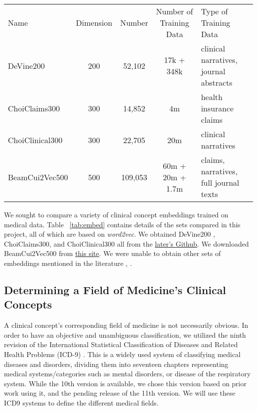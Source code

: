 \documentclass[11pt,a4paper]{article}
\begin{document}
\begin{table*}[h!]
	
	\begin{center}
		\begin{tabular}{lcccl} %
			Name & Dimension & Number & Number of Training Data& Type of Training Data \\
			\hlineB{4}
			DeVine200 & 200 & 52,102 & 17k + 348k &clinical narratives, journal abstracts\\
			\hline
			ChoiClaims300 & 300 & 14,852& 4m&health insurance claims\\
			\hline
			ChoiClinical300 & 300 & 22,705&20m& clinical narratives\\
			\hline
			BeamCui2Vec500 & 500 & 109,053&60m + 20m + 1.7m& claims, narratives, full journal texts\\
		\end{tabular}
	\end{center}
	\caption{Characteristics of the embeddings compared, including the name referred, the embedding dimensions, the number of embeddings in the dataset, and the type of data used to train them.}
	\label{tab:embed}
\end{table*}

We sought to compare a variety of clinical concept embeddings trained on medical data. Table ~\ref{tab:embed} contains details of the sets compared in this project, all of which are based on \emph{word2vec}. We obtained DeVine200 \cite{devineMedicalSemanticSimilarity2014}, ChoiClaims300, and ChoiClinical300 \cite{choiLearningLowDimensionalRepresentations2016} all from the \href{https://github.com/clinicalml/embeddings}{later's Github}. We downloaded BeamCui2Vec500 \cite{beamClinicalConceptEmbeddings2018} from \href{https://figshare.com/s/00d69861786cd0156d81}{this site}. We were unable to obtain other sets of embeddings mentioned in the literature \cite{minarro-gimenezExploringApplicationDeep2014}, \cite{zhangAdaptingWordEmbeddings2018} \cite{xiangTimesensitiveClinicalConcept2019}.


\subsection{Determining a Field of Medicine's Clinical Concepts}
A clinical concept's corresponding field of medicine is not necessarily obvious. In order to have an objective and unambiguous classification, we utilized the ninth revision of the International Statistical Classification of Diseases and Related Health Problems (ICD-9) \cite{sleeInternationalClassificationDiseases1978}. This is a widely used system of classifying medical diseases and disorders, dividing them into seventeen chapters representing medical systems/categories such as mental disorders, or disease of the respiratory system. While the 10th version is available, we chose this version based on prior work using it, and the pending release of the 11th version. We will use these ICD9 systems to define the different medical fields. 
\end{document}
